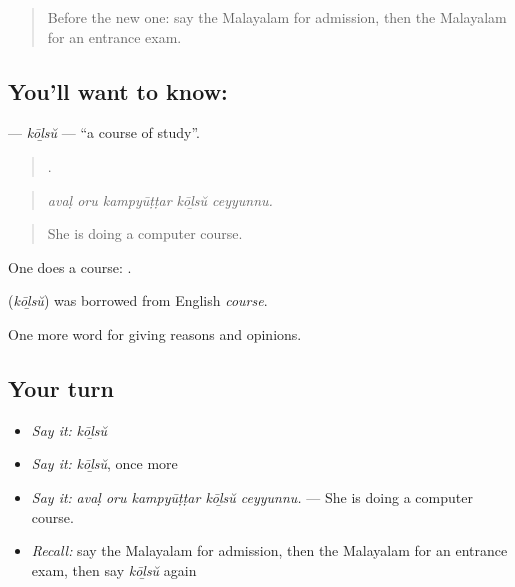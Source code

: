 \label{lesson:ML-C433-kolsu}



\begin{quote}
Before the new one: say the Malayalam for admission, then the Malayalam for an entrance exam.
\end{quote}

\subsection*{You'll want to know: }
\textbf{} — \emph{kōḻsŭ} — \textquotedblleft{}a course of study\textquotedblright{}.

\begin{quote}
    .
\end{quote}

\begin{quote}
\emph{avaḷ oru kampyūṭṭar kōḻsŭ ceyyunnu.}
\end{quote}

\begin{quote}
She is doing a computer course.
\end{quote}

One does a course:  .

\begin{cousinweb}
\textbf{} (\emph{kōḻsŭ}) was borrowed from English \emph{course}.
\end{cousinweb}

\begin{grammarlens}[title={What you've built}]
One more word for giving reasons and opinions.
\end{grammarlens}

\subsection*{Your turn}
\begin{itemize}
\raggedright
  \item \emph{Say it:} \emph{kōḻsŭ}
  \item \emph{Say it:} \emph{kōḻsŭ}, once more
  \item \emph{Say it:} \emph{avaḷ oru kampyūṭṭar kōḻsŭ ceyyunnu.} — She is doing a computer course.
  \item \emph{Recall:} say the Malayalam for admission, then the Malayalam for an entrance exam, then say \emph{kōḻsŭ} again
\end{itemize}

